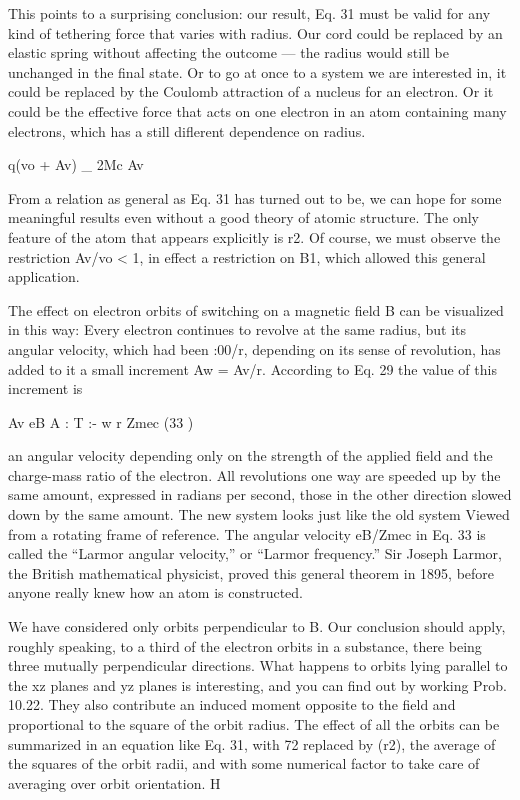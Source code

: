 {{{This points to a surprising conclusion: our result, Eq. 31 must be
valid for any kind of tethering force that varies with radius. Our
cord could be replaced by an elastic spring without affecting the
outcome --- the radius would still be unchanged in the final state.
Or to go at once to a system we are interested in, it could be replaced
by the Coulomb attraction of a nucleus for an electron. Or it could
be the effective force that acts on one electron in an atom containing
many electrons, which has a still diflerent dependence on radius.

q(vo + Av) _ 2Mc Av

From a relation as general as Eq. 31 has turned out to be, we can hope
for some meaningful results even without a good theory of atomic
structure. The only feature of the atom that appears explicitly is r2.
Of course, we must observe the restriction Av/vo < 1, in effect a
restriction on B1, which allowed this general application.

The effect on electron orbits of switching on a magnetic field B can
be visualized in this way: Every electron continues to revolve at the
same radius, but its angular velocity, which had been :00/r, depending
on its sense of revolution, has added to it a small increment
Aw = Av/r. According to Eq. 29 the value of this increment is

Av eB
A : T :-
w r Zmec (33 )

an angular velocity depending only on the strength of the applied
field and the charge-mass ratio of the electron. All revolutions one
way are speeded up by the same amount, expressed in radians per
second, those in the other direction slowed down by the same
amount. The new system looks just like the old system Viewed from
a rotating frame of reference. The angular velocity eB/Zmec in Eq. 33
is called the ``Larmor angular velocity,'' or ``Larmor frequency.''
Sir Joseph Larmor, the British mathematical physicist, proved this
general theorem in 1895, before anyone really knew how an atom
is constructed.

We have considered only orbits perpendicular to B. Our conclusion
should apply, roughly speaking, to a third of the electron
orbits in a substance, there being three mutually perpendicular
directions. What happens to orbits lying parallel to the xz planes
and yz planes is interesting, and you can find out by working
Prob. 10.22. They also contribute an induced moment opposite to
the field and proportional to the square of the orbit radius. The
effect of all the orbits can be summarized in an equation like Eq. 31,
with 72 replaced by (r2), the average of the squares of the orbit radii,
and with some numerical factor to take care of averaging over orbit
orientation. H

}}}
